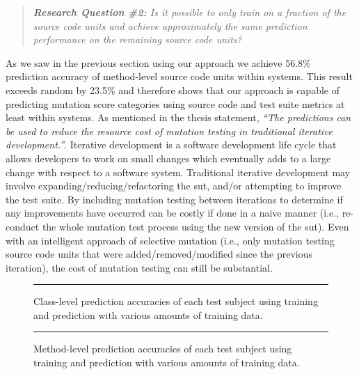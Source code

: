 \begin{quote}
  \emph{\textbf{Research Question \#2:} Is it possible to only train on a fraction of the source code units and achieve approximately the same prediction performance on the remaining source code units?}
\end{quote}

\noindent
As we saw in the previous section using our approach we achieve 56.8\% prediction accuracy of method-level source code units within systems. This result exceeds random by 23.5\% and therefore shows that our approach is capable of predicting mutation score categories using source code and test suite metrics at least within systems. As mentioned in the thesis statement, \emph{``The predictions can be used to reduce the resource cost of mutation testing in traditional iterative development.''}. Iterative development is a software development life cycle that allows developers to work on small changes which eventually adds to a large change with respect to a software system. Traditional iterative development may involve expanding/reducing/refactoring the \gls{sut}, and/or attempting to improve the test suite. By including mutation testing between iterations to determine if any improvements have occurred can be costly if done in a naive manner (i.e., re-conduct the whole mutation test process using the new version of the \gls{sut}). Even with an intelligent approach of selective mutation (i.e., only mutation testing source code units that were added/removed/modified since the previous iteration), the cost of mutation testing can still be substantial.

\begin{figure}[!tb]
  \centering
  \begin{adjustbox}{max size={.95\textwidth}{.90\textheight}}
    
  \end{adjustbox}
  \caption{Class-level prediction accuracies of each test subject using training and prediction with various amounts of training data.}
  \vspace{2mm}
  \hrule
  \label{fig:divisor_class_graph}
\end{figure}

\begin{figure}[!tb]
  \centering
  \begin{adjustbox}{max size={.95\textwidth}{.90\textheight}}
    
  \end{adjustbox}
  \caption{Method-level prediction accuracies of each test subject using training and prediction with various amounts of training data.}
  \vspace{2mm}
  \hrule
  \label{fig:divisor_method_graph}
\end{figure}
\afterpage\clearpage

